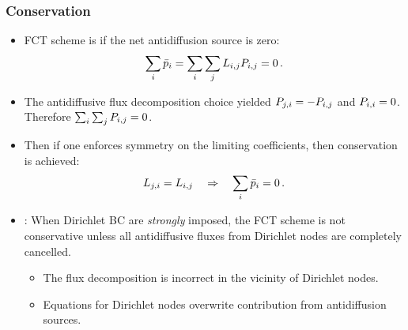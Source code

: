 \begin{frame}
\frametitle{Conservation}

\begin{itemize}
  \item FCT scheme is  if the net antidiffusion source
    is zero:
    \begin{equation}
      \sum\limits_i \bar{\correctionfluxletter}_i
        = \sum\limits_i\sumj L\ij\correctionfluxij = 0 \eqp
    \end{equation}
  \item The antidiffusive flux decomposition choice yielded
    $\correctionfluxji = -\correctionfluxij$ and $\correctionfluxentry_{i,i}=0$.
    Therefore $\sum_i\sum_j\correctionfluxij = 0$.
  \item Then if one enforces symmetry on the limiting coefficients, then
    conservation is achieved:
    \begin{equation}
      L_{j,i} = L_{i,j} \quad \Rightarrow \quad
      \sum\limits_i \bar{p}_i = 0 \,.
    \end{equation}
  \item {}: When Dirichlet BC are \emph{strongly} imposed, the FCT
    scheme is not conservative unless all antidiffusive fluxes from Dirichlet
    nodes are completely cancelled.
    \begin{itemize}
      \item The flux decomposition is incorrect in the vicinity of Dirichlet nodes.
      \item Equations for Dirichlet nodes overwrite contribution from antidiffusion
        sources.
    \end{itemize}
\end{itemize}

\end{frame}
